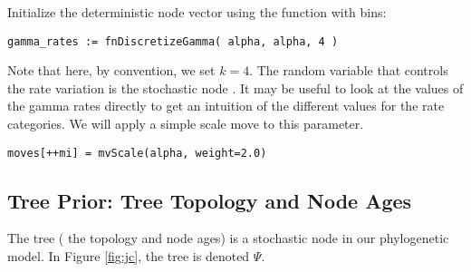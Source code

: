 Initialize the  deterministic node vector using the   function with  bins:
{\tt \begin{snugshade*}
\begin{lstlisting}
gamma_rates := fnDiscretizeGamma( alpha, alpha, 4 )
\end{lstlisting}
\end{snugshade*}}

Note that here, by convention, we set $k = 4$.
The random variable that controls the rate variation is the stochastic node . 
It may be useful to look at the values of the gamma rates directly to get an intuition of the different values for the rate categories.
We will apply a simple scale move to this parameter.
{\tt \begin{snugshade*}
\begin{lstlisting}
moves[++mi] = mvScale(alpha, weight=2.0)
\end{lstlisting}
\end{snugshade*}}


\subsection{Tree Prior: Tree Topology and Node Ages}

The tree ( the topology and node ages) is a stochastic node in our phylogenetic model. 
In Figure \ref{fig:jc}, the tree is denoted $\Psi$.

